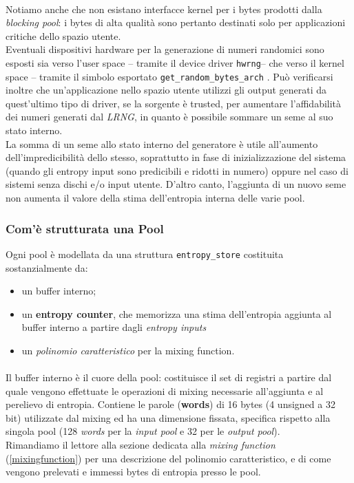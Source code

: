 \documentclass{article}
\begin{document}
 \paragraph{}Notiamo anche che non esistano interfacce kernel per i bytes
 prodotti dalla \emph{blocking pool}: i bytes di alta qualità sono pertanto destinati
 solo per applicazioni critiche dello spazio utente. \\
 Eventuali dispositivi hardware per la generazione di numeri
 randomici sono esposti sia verso l'user space -- tramite il device driver
 \verb+hwrng+-- che verso il kernel space -- tramite il simbolo esportato 
 \verb+get_random_bytes_arch+ . Può verificarsi inoltre che un'applicazione
 nello spazio utente utilizzi gli output generati da quest'ultimo tipo di
 driver, se la sorgente è trusted, per aumentare l'affidabilità dei numeri
 generati dal \emph{LRNG}, in quanto è possibile sommare un
 seme al suo stato interno.
 \\
 La somma di un seme allo stato interno del generatore è utile all'aumento
 dell'impredicibilità dello stesso, soprattutto in fase di inizializzazione del
 sistema (quando gli entropy input sono predicibili e ridotti in numero) oppure
 nel caso di sistemi senza dischi e/o input utente. D'altro canto, l'aggiunta di
 un nuovo seme non aumenta il valore della stima dell'entropia interna delle
 varie pool.
 \subsubsection{Com'è strutturata una Pool}
 Ogni pool è modellata
 da una struttura \verb+entropy_store+ costituita sostanzialmente da:
 \begin{itemize}
   \item un buffer interno; 
   \item un \textbf{entropy counter}, che memorizza una stima dell'entropia
   aggiunta al buffer interno a partire dagli \emph{entropy inputs}
   \item un \emph{polinomio caratteristico} per la mixing function.
 \end{itemize}
 

 \paragraph{}Il buffer interno è il cuore della pool: costituisce il set di 
 registri a partire dal quale vengono effettuate le operazioni di mixing necessarie
 all'aggiunta e al perelievo di entropia. Contiene le parole (\textbf{words}) di
 16 bytes (4 unsigned a 32 bit) utilizzate dal mixing ed ha una dimensione fissata,
 specifica rispetto alla singola pool (128 \emph{words} per la \emph{input pool} e 32 per
 le \emph{output pool}). \\
 Rimandiamo il lettore alla sezione dedicata alla \emph{mixing function}
 (\ref{mixingfunction}) per una descrizione del polinomio caratteristico, e di
 come vengono prelevati e immessi bytes di entropia presso le pool.
 
\end{document}

